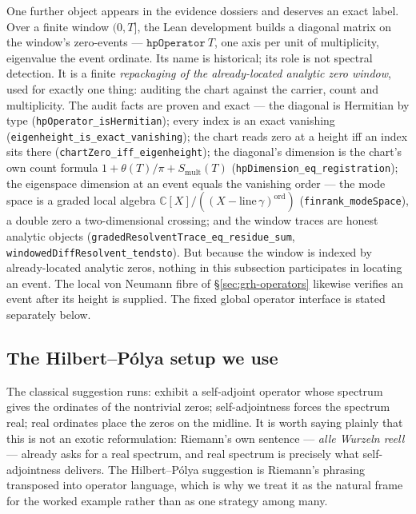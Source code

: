 \documentclass[11pt]{article}
\theoremstyle{definition}
\begin{document}
One further object appears in the evidence dossiers and deserves an exact
label. Over a finite window \((0,T]\), the Lean development builds a
diagonal matrix on the window's zero-events --- \(\texttt{hpOperator}\ T\),
one axis per unit of multiplicity, eigenvalue the event ordinate. Its name
is historical; its role is not spectral detection. It is a finite
\emph{repackaging of the already-located analytic zero window}, used for
exactly one thing: auditing the chart against the carrier, count and
multiplicity. The audit facts are proven and exact --- the diagonal is
Hermitian by type (\texttt{hpOperator\_isHermitian}); every index is an
exact vanishing (\texttt{eigenheight\_is\_exact\_vanishing}); the chart
reads zero at a height iff an index sits there
(\texttt{chartZero\_iff\_eigenheight}); the diagonal's dimension is the
chart's own count formula \(1+\theta(T)/\pi+S_{\mathrm{mult}}(T)\)
(\texttt{hpDimension\_eq\_registration}); the eigenspace dimension at an
event equals the vanishing order --- the mode space is a graded local
algebra \(\mathbb C[X]/((X-\mathrm{line}\,\gamma)^{\mathrm{ord}})\)
(\texttt{finrank\_modeSpace}), a double zero a two-dimensional crossing;
and the window traces are honest analytic objects
(\texttt{gradedResolventTrace\_eq\_residue\_sum},
\texttt{windowedDiffResolvent\_tendsto}). But because the window is indexed
by already-located analytic zeros, nothing in this subsection participates
in locating an event.  The local von Neumann fibre of
\S\ref{sec:grh-operators} likewise verifies an event after its height is
supplied.  The fixed global operator interface is stated separately below.

\subsection{The Hilbert--P\'olya setup we use}\label{sec:grh-hp-setup}

The classical suggestion runs: exhibit a self-adjoint operator whose spectrum
gives the ordinates of the nontrivial zeros; self-adjointness forces the
spectrum real; real ordinates place the zeros on the midline. It is worth
saying plainly that this is not an exotic reformulation: Riemann's own
sentence --- \emph{alle Wurzeln reell} --- already asks for a real spectrum,
and real spectrum is precisely what self-adjointness delivers. The
Hilbert--P\'olya suggestion is Riemann's phrasing transposed into operator
language, which is why we treat it as the natural frame for the worked
example rather than as one strategy among many.
\end{document}
